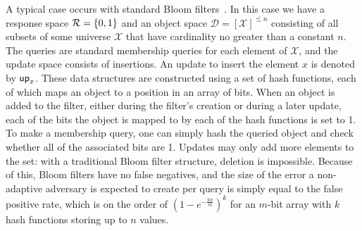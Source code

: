 
A typical case occurs with standard Bloom filters~\cite{bloomfilter}. In this case we have a response space $\mathcal{R} = \{0,1\}$ and an object space $\mathcal{D} = [\mathcal{X}]^{\le n}$ consisting of all subsets of some universe $\mathcal{X}$ that have cardinality no greater than a constant $n$. The queries are standard membership queries for each element of $\mathcal{X}$, and the update space consists of insertions. An update to insert the element $x$ is denoted by $\mathsf{up}_x$. These data structures are constructed using a set of hash functions, each of which maps an object to a position in an array of bits. When an object is added to the filter, either during the filter's creation or during a later update, each of the bits the object is mapped to by each of the hash functions is set to 1. To make a membership query, one can simply hash the queried object and check whether all of the associated bits are 1. Updates may only add more elements to the set: with a traditional Bloom filter structure, deletion is impossible. Because of this, Bloom filters have no false negatives, and the size of the error a non-adaptive adversary is expected to create per query is simply equal to the false positive rate, which is on the order of $(1-e^{-\frac{kn}{m}})^k$ for an $m$-bit array with $k$ hash functions storing up to $n$ values.


